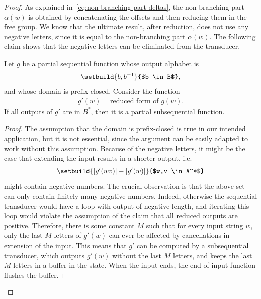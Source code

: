 \begin{proof}
As explained in~\eqref{eq:non-branching-part-deltas},  the non-branching part $\alpha(w)$ is obtained by concatenating the offsets and then reducing them in the free group. We know that the ultimate result, after reduction, does not use any negative letters, since it is equal to the non-branching part $\alpha(w)$. The following claim shows that the negative letters can be eliminated from the transducer. 
\begin{claim}\label{claim:eliminating-negative-letters}
    Let $g$ be a partial sequential function whose output alphabet is 
    \begin{align*}
    \setbuild{ b, b^{-1}}{$b \in B$},
    \end{align*}
and whose domain is prefix closed. Consider the function 
    \begin{align*}
    g'(w)  = \text{reduced form of $g(w)$}.
    \end{align*}
    If all outputs of $g'$ are in  $B^*$, then it is a partial subsequential function.
\end{claim}
\begin{proof}
    The assumption that the domain is prefix-closed  is true in our intended application, but it is not essential, since the argument can be easily adapted to work without this assumption.
    Because of the negative letters, it might be the case that  extending the input results in a shorter output, i.e. 
    \begin{align}
        \label{eq:size-increase}
      \setbuild{|g'(wv)| - |g'(w)|} {$w,v \in A^*$}
    \end{align}
    might contain negative numbers. The crucial observation is that the above set can only contain finitely many negative numbers. Indeed, otherwise  the sequential transducer would have a loop with output of negative length, and iterating this loop would violate the assumption of the claim that all reduced outputs are positive. Therefore, there is some constant $M$ such that for every input string $w$, only the last $M$ letters of $g'(w)$ can ever be affected by cancellations in extension of the input. This means that $g'$ can be computed by a subsequential transducer, which outputs $g'(w)$ without the last $M$ letters, and keeps the last $M$ letters in a buffer in the state. When the input ends, the end-of-input function flushes the buffer.
\end{proof}




\end{proof}

